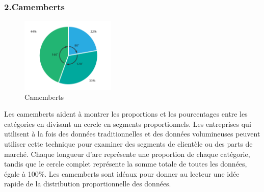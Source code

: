\documentclass[french, a4paper, 12pt]{report}
\begin{document}
\subsubsection{2.Camemberts }
\begin{figure}
\centering
\includegraphics[width=0.4\textwidth]{images/pie_chart.png}
\caption{\label{fig:1.4}Camemberts}
\end{figure}

Les camemberts aident à montrer les proportions et les pourcentages entre les catégories en divisant un cercle en segments proportionnels. Les entreprises qui utilisent à la fois des données traditionnelles et des données volumineuses peuvent utiliser cette technique pour examiner des segments de clientèle ou des parts de marché.
Chaque longueur d'arc représente une proportion de chaque catégorie, tandis que le cercle complet représente la somme totale de toutes les données, égale à 100\%.
Les camemberts sont idéaux pour donner au lecteur une idée rapide de la distribution proportionnelle des données.
\end{document}
